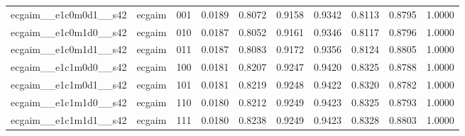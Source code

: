 \begin{tabular}{lllrrrrrrr}
ecgaim__e1c0m0d1__s42 & ecgaim & 001 & 0.0189 & 0.8072 & 0.9158 & 0.9342 & 0.8113 & 0.8795 & 1.0000 \\
ecgaim__e1c0m1d0__s42 & ecgaim & 010 & 0.0187 & 0.8052 & 0.9161 & 0.9346 & 0.8117 & 0.8796 & 1.0000 \\
ecgaim__e1c0m1d1__s42 & ecgaim & 011 & 0.0187 & 0.8083 & 0.9172 & 0.9356 & 0.8124 & 0.8805 & 1.0000 \\
ecgaim__e1c1m0d0__s42 & ecgaim & 100 & 0.0181 & 0.8207 & 0.9247 & 0.9420 & 0.8325 & 0.8788 & 1.0000 \\
ecgaim__e1c1m0d1__s42 & ecgaim & 101 & 0.0181 & 0.8219 & 0.9248 & 0.9422 & 0.8320 & 0.8782 & 1.0000 \\
ecgaim__e1c1m1d0__s42 & ecgaim & 110 & 0.0180 & 0.8212 & 0.9249 & 0.9423 & 0.8325 & 0.8793 & 1.0000 \\
ecgaim__e1c1m1d1__s42 & ecgaim & 111 & 0.0180 & 0.8238 & 0.9249 & 0.9423 & 0.8328 & 0.8803 & 1.0000 \\
\bottomrule
\end{tabular}
